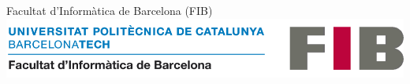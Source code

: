 \documentclass[a4paper]{article}
\begin{document}
    \vspace{10mm}
    {\centering
    {\Large Facultat d'Informàtica de Barcelona (FIB)}\\
    \vspace{3mm}
    \includegraphics[scale=0.25]{images/portada/logo-fib.png}
    \par
}



\newpage
\renewcommand{\contentsname}{Índice}
\tableofcontents
\newpage

%


%

\newpage

%





\newpage





\newpage

\appendixpage
\appendix



\newpage





\newpage



\newpage





\newpage



\newpage



\nocite{*}
\end{document}

